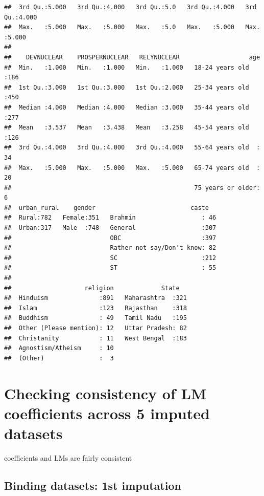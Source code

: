 \documentclass[
]{article}
\begin{document}
\begin{verbatim}
##  3rd Qu.:5.000   3rd Qu.:4.000   3rd Qu.:5.0   3rd Qu.:4.000   3rd Qu.:4.000  
##  Max.   :5.000   Max.   :5.000   Max.   :5.0   Max.   :5.000   Max.   :5.000  
##                                                                               
##    DEVNUCLEAR    PROSPERNUCLEAR   RELYNUCLEAR                   age     
##  Min.   :1.000   Min.   :1.000   Min.   :1.000   18-24 years old  :186  
##  1st Qu.:3.000   1st Qu.:3.000   1st Qu.:2.000   25-34 years old  :450  
##  Median :4.000   Median :4.000   Median :3.000   35-44 years old  :277  
##  Mean   :3.537   Mean   :3.438   Mean   :3.258   45-54 years old  :126  
##  3rd Qu.:4.000   3rd Qu.:4.000   3rd Qu.:4.000   55-64 years old  : 34  
##  Max.   :5.000   Max.   :5.000   Max.   :5.000   65-74 years old  : 20  
##                                                  75 years or older:  6  
##  urban_rural    gender                          caste    
##  Rural:782   Female:351   Brahmin                  : 46  
##  Urban:317   Male  :748   General                  :307  
##                           OBC                      :397  
##                           Rather not say/Don't know: 82  
##                           SC                       :212  
##                           ST                       : 55  
##                                                          
##                    religion             State    
##  Hinduism              :891   Maharashtra  :321  
##  Islam                 :123   Rajasthan    :318  
##  Buddhism              : 49   Tamil Nadu   :195  
##  Other (Please mention): 12   Uttar Pradesh: 82  
##  Christanity           : 11   West Bengal  :183  
##  Agnostism/Atheism     : 10                      
##  (Other)               :  3
\end{verbatim}

\hypertarget{checking-consistency-of-lm-coefficients-across-5-imputed-datasets}{%
\section{Checking consistency of LM coefficients across 5 imputed
datasets}\label{checking-consistency-of-lm-coefficients-across-5-imputed-datasets}}

coefficients and LMs are fairly consistent

\hypertarget{binding-datasets-1st-imputation}{%
\subsection{Binding datasets: 1st
imputation}\label{binding-datasets-1st-imputation}}
\end{document}
